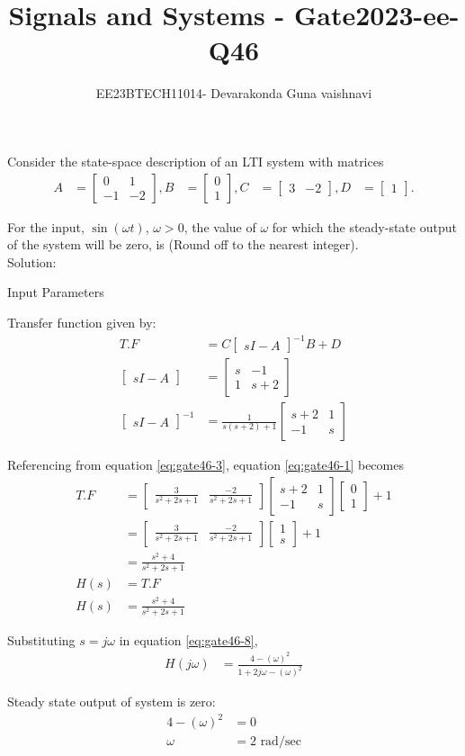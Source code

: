\documentclass[12pt]{article}
\title{Signals and Systems - Gate2023-ee-Q46}
\author{EE23BTECH11014- Devarakonda Guna vaishnavi}
\newcommand{\myvec}[1]{\ensuremath{\begin{bmatrix}#1\end{bmatrix}}}
\begin{document}
\maketitle

Consider the state-space description of an LTI system with matrices
\begin{align*}
A &=  \myvec{0 & 1 \\ -1 & -2}, B&=\myvec {0 \\ 1}, C &=\myvec {3 & -2}, D&= \myvec{1}.
\end{align*}

For the input, $\sin(\omega t)$, $\omega > 0$, the value of $\omega$ for which the steady-state output of the system will be zero, is \underline{\hspace{2cm}} (Round off to the nearest integer).\\
Solution:
\begin{table}[h!]
    \centering
    
    \caption{Input Parameters}
    \label{table:parameters}
\end{table}

Transfer function given by:
\begin{align}
T.F &= C\myvec {sI-A}^{-1}B + D \label{eq:gate46-1}\\
\myvec{sI-A} &= \myvec {s & -1 \\  1  & s+2} \label{eq:gate46-2}\\
\myvec{sI - A}^{-1} &= \frac{1}{s(s+2)+1} \myvec {s+2 & 1 \\ -1 & s}  \label{eq:gate46-3}
\end{align}

Referencing from equation \eqref{eq:gate46-3}, equation \eqref{eq:gate46-1} becomes 
\begin{align}
T.F &= \myvec{ \frac{3}{s^2+2s+1} & \frac{-2}{s^2+2s+1} } \myvec {s+2 & 1 \\ -1 & s} \myvec{0 \\ 1} + 1 \\
&= \myvec{ \frac{3}{s^2+2s+1} & \frac{-2}{s^2+2s+1} }  \myvec{1 \\ s} + 1 \\
&= \frac{s^2 + 4}{s^2 + 2s + 1} \\
H(s) &= T.F \\
H(s) &= \frac{s^2 + 4}{s^2+2s+1} \label{eq:gate46-8}
\end{align}

Substituting $s=j\omega$ in equation \eqref{eq:gate46-8},
\begin{align}
H(j\omega) &= \frac{4-(\omega)^2}{1+2j\omega-(\omega)^2}
\end{align}

Steady state output of system is zero:
\begin{align}
4-(\omega)^2 &= 0 \\
\omega &= 2 \text{ rad/sec}
\end{align}
\end{document}
